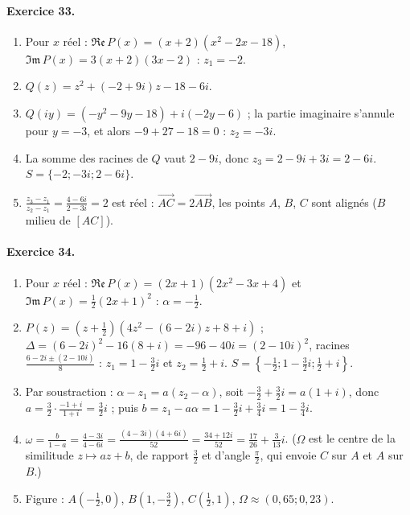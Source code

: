 \begin{corrige}
\paragraph{Exercice 33.}
\begin{enumerate}
\item Pour $x$ r\'eel : $\mathfrak{Re}\,P(x) = (x + 2)(x^2 - 2x - 18)$, $\mathfrak{Im}\,P(x) = 3(x + 2)(3x - 2)$ : $z_1 = -2$.
\item $Q(z) = z^2 + (-2 + 9i)z - 18 - 6i$.
\item $Q(iy) = (-y^2 - 9y - 18) + i(-2y - 6)$ ; la partie imaginaire s'annule pour $y = -3$, et alors $-9 + 27 - 18 = 0$ : $z_2 = -3i$.
\item La somme des racines de $Q$ vaut $2 - 9i$, donc $z_3 = 2 - 9i + 3i = 2 - 6i$. $S = \{-2 ; -3i ; 2 - 6i\}$.
\item $\frac{z_3 - z_1}{z_2 - z_1} = \frac{4 - 6i}{2 - 3i} = 2$ est r\'eel : $\overrightarrow{AC} = 2\overrightarrow{AB}$, les points $A$, $B$, $C$ sont align\'es ($B$ milieu de $[AC]$).
\end{enumerate}

\paragraph{Exercice 34.}
\begin{enumerate}
\item Pour $x$ r\'eel : $\mathfrak{Re}\,P(x) = (2x + 1)(2x^2 - 3x + 4)$ et $\mathfrak{Im}\,P(x) = \frac{1}{2}(2x + 1)^2$ : $\alpha = -\frac{1}{2}$.
\item $P(z) = \left(z + \frac{1}{2}\right)\left(4z^2 - (6 - 2i)z + 8 + i\right)$ ; $\Delta = (6 - 2i)^2 - 16(8 + i) = -96 - 40i = (2 - 10i)^2$,
      racines $\frac{6 - 2i \pm (2 - 10i)}{8}$ : $z_1 = 1 - \frac{3}{2}i$ et $z_2 = \frac{1}{2} + i$.
      $S = \left\{-\frac{1}{2} ; 1 - \frac{3}{2}i ; \frac{1}{2} + i\right\}$.
\item Par soustraction : $\alpha - z_1 = a(z_2 - \alpha)$, soit $-\frac{3}{2} + \frac{3}{2}i = a(1 + i)$, donc $a = \frac{3}{2}\cdot\frac{-1 + i}{1 + i} = \frac{3}{2}i$ ;
      puis $b = z_1 - a\alpha = 1 - \frac{3}{2}i + \frac{3}{4}i = 1 - \frac{3}{4}i$.
\item $\omega = \frac{b}{1 - a} = \frac{4 - 3i}{4 - 6i} = \frac{(4 - 3i)(4 + 6i)}{52} = \frac{34 + 12i}{52} = \boxed{\frac{17}{26} + \frac{3}{13}i}$.
      ($\Omega$ est le centre de la similitude $z \mapsto az + b$, de rapport $\frac{3}{2}$ et d'angle $\frac{\pi}{2}$, qui envoie $C$ sur $A$ et $A$ sur $B$.)
\item Figure : $A\left(-\frac{1}{2}, 0\right)$, $B\left(1, -\frac{3}{2}\right)$, $C\left(\frac{1}{2}, 1\right)$, $\Omega \approx (0{,}65 ; 0{,}23)$.
\end{enumerate}


\end{corrige}
